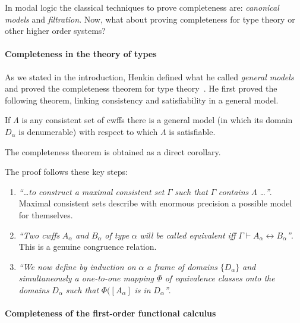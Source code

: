 In modal logic the classical techniques to prove completeness are: 
\emph{canonical models} and \emph{filtration}. Now, what about proving
completeness for type theory or other higher order systems?

\paragraph{Completeness in the theory of types}

As we stated in the introduction, Henkin defined what he called 
\emph{general models} and proved the completeness theorem for type 
theory~\cite{Henkin1950}. He first proved the following theorem, linking
consistency and satisfiability in a general model.

\begin{theorem}
If $\Lambda$ is any consistent set
of cwffs there is a general model (in which its domain  $D_{\alpha}$
is denumerable) with respect to which $\Lambda$ is satisfiable.
\end{theorem}

The completeness theorem is obtained as a direct corollary.

The proof follows these key steps:

\begin{enumerate}
\item \emph{``\ldots to construct a maximal consistent set} $\Gamma$ 
\emph{such that} $\Gamma$ \emph{contains} $\Lambda$ \emph{\ldots''}. Maximal
consistent sets describe with enormous precision a possible model for
themselves.

\item \emph{``Two cwffs} $A_{\alpha}$ \emph{and} $B_{\alpha}$ 
\emph{of type} $\alpha$ \emph{will be called equivalent iff} $\Gamma
\vdash A_{\alpha }\leftrightarrow B_{\alpha }$\emph{''}. This is a genuine
congruence relation.

\item \emph{``We now define by induction on} $\alpha$ \emph{a 
frame of domains} $\{D_\alpha\}$ \emph{and simultaneously a
one-to-one mapping} $\Phi$ \emph{of equivalence classes onto the domains} $D_{\alpha}$ 
\emph{such that} $\Phi (\left[ A_{\alpha }\right]$
\emph{is in} $D_{\alpha }$\emph{''}.
\end{enumerate}

\paragraph{Completeness of the first-order functional calculus}


